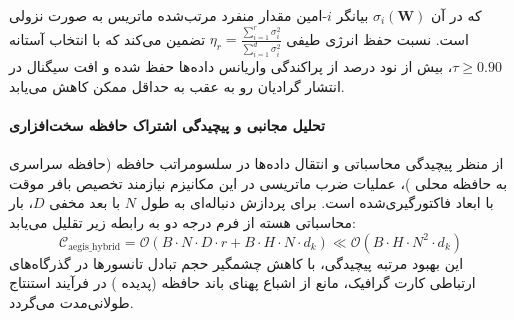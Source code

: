 که در آن $\sigma_i(\mathbf{W})$ بیانگر $i$-امین مقدار منفرد مرتب‌شده ماتریس به صورت نزولی است. نسبت حفظ انرژی طیفی $\eta_r = \frac{\sum_{i=1}^r \sigma_i^2}{\sum_{i=1}^{d} \sigma_i^2}$ تضمین می‌کند که با انتخاب آستانه $\tau \ge 0.90$، بیش از نود درصد از پراکندگی واریانس داده‌ها حفظ شده و افت سیگنال در انتشار گرادیان رو به عقب به حداقل ممکن کاهش می‌یابد.

\paragraph{تحلیل مجانبی و پیچیدگی اشتراک حافظه سخت‌افزاری}
از منظر پیچیدگی محاسباتی و انتقال داده‌ها در سلسومراتب حافظه (حافظه سراسری  به حافظه محلی )، عملیات ضرب ماتریسی در این مکانیزم نیازمند تخصیص بافر موقت با ابعاد فاکتورگیری‌شده است. برای پردازش دنباله‌ای به طول $N$ با بعد مخفی $D$، بار محاسباتی هسته از فرم درجه دو به رابطه زیر تقلیل می‌یابد:
\begin{equation}
\label{eq:complexity_aegis_hybrid}
\mathcal{C}_{\text{aegis\_hybrid}} = \mathcal{O}\left( B \cdot N \cdot D \cdot r + B \cdot H \cdot N \cdot d_k \right) \ll \mathcal{O}\left( B \cdot H \cdot N^2 \cdot d_k \right)
\end{equation}
این بهبود مرتبه پیچیدگی، با کاهش چشمگیر حجم تبادل تانسورها در گذرگاه‌های ارتباطی کارت گرافیک، مانع از اشباع پهنای باند حافظه (پدیده ) در فرآیند استنتاج طولانی‌مدت می‌گردد.
